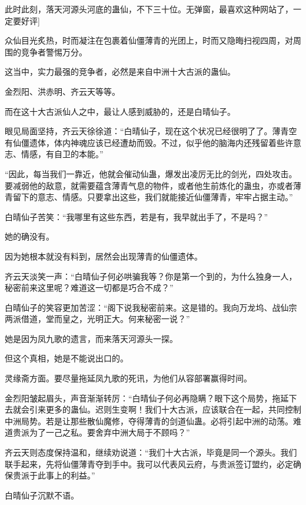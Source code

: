 
\begin{this_body}

此时此刻，落天河源头河底的蛊仙，不下三十位。无弹窗，最喜欢这种网站了，一定要好评]

众仙目光炙热，时而凝注在包裹着仙僵薄青的光团上，时而又隐晦扫视四周，对周围的竞争者警惕万分。

这当中，实力最强的竞争者，必然是来自中洲十大古派的蛊仙。

金烈阳、洪赤明、齐云天等等。

而在这十大古派仙人之中，最让人感到威胁的，还是白晴仙子。

眼见局面坚持，齐云天徐徐道：“白晴仙子，现在这个状况已经很明了了。薄青空有仙僵遗体，体内神魂应该已经遭劫而毁。不过，似乎他的脑海内还残留着些许意志、情感，有自卫的本能。”

“因此，每当我们一靠近，他就会催动仙蛊，爆发出凌厉无比的剑光，四处攻击。要减弱他的敌意，就需要蕴含薄青气息的物件，或者他生前炼化的蛊虫，亦或者薄青留下的意志、情感。只要拿出这些，我们就能接近仙僵薄青，牢牢占据主动。”

白晴仙子苦笑：“我哪里有这些东西，若是有，我早就出手了，不是吗？”

她的确没有。

因为她根本就没有料到，居然会出现薄青的仙僵遗体。

齐云天淡笑一声：“白晴仙子何必哄骗我等？你是第一个到的，为什么独身一人，秘密前来这里呢？难道这一切都是巧合不成？”

白晴仙子的笑容更加苦涩：“阁下说我秘密前来。这是错的。我向万龙坞、战仙宗两派借道，堂而皇之，光明正大。何来秘密一说？”

她是因为凤九歌的遗言，而来落天河源头一探。

但这个真相，她是不能说出口的。

灵缘斋方面。要尽量拖延凤九歌的死讯，为他们从容部署赢得时间。

金烈阳皱起眉头，声音渐渐转厉：“白晴仙子何必再隐瞒？眼下这个局势，拖延下去就会引来更多的蛊仙。迟则生变啊！我们十大古派，应该联合在一起，共同控制中洲局势。若是让那些散仙魔修，夺得薄青的剑道仙蛊。必将引起中洲的动荡。难道贵派为了一己之私。要舍弃中洲大局于不顾吗？”

齐云天则态度保持温和，继续劝说道：“我们十大古派，毕竟是同一个源头。我们联手起来，先将仙僵薄青夺到手中。我可以代表风云府，与贵派签订盟约，必定确保贵派于此事上的利益。”

白晴仙子沉默不语。


\end{this_body}
